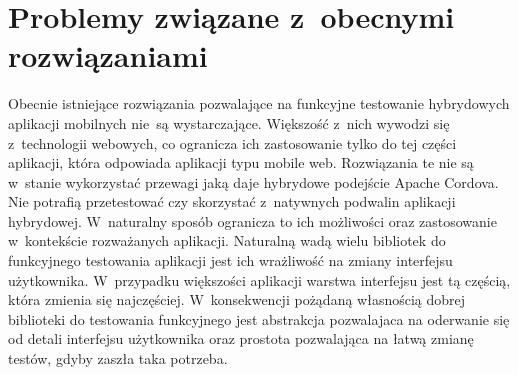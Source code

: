\documentclass[brudnopis]{xmgr}
\begin{document}
\section{Problemy związane z~obecnymi rozwiązaniami}

Obecnie istniejące rozwiązania pozwalające na funkcyjne testowanie hybrydowych aplikacji mobilnych nie~są wystarczające. Większość z~nich wywodzi się z~technologii webowych, co ogranicza ich zastosowanie tylko do tej części aplikacji, która odpowiada aplikacji typu mobile web. Rozwiązania te nie są w~stanie wykorzystać przewagi jaką daje hybrydowe podejście Apache Cordova. Nie potrafią przetestować czy skorzystać z~natywnych podwalin aplikacji hybrydowej. W~naturalny sposób ogranicza to ich możliwości oraz zastosowanie w~kontekście rozważanych aplikacji. Naturalną wadą wielu bibliotek do funkcyjnego testowania aplikacji jest ich wrażliwość na zmiany interfejsu użytkownika. W~przypadku większości aplikacji warstwa interfejsu jest tą częścią, która zmienia się najczęściej. W~konsekwencji pożądaną własnością dobrej biblioteki do testowania funkcyjnego jest abstrakcja pozwalajaca na oderwanie się od detali interfejsu użytkownika oraz prostota pozwalająca na łatwą zmianę testów, gdyby zaszła taka potrzeba. 
\end{document}
